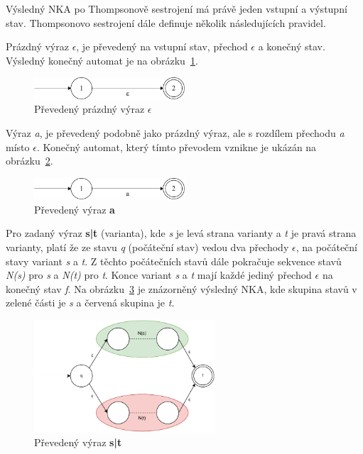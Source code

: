 Výsledný NKA po Thompsonově sestrojení má právě jeden vstupní a výstupní stav. 
Thompsonovo sestrojení dále definuje několik následujících pravidel.

Prázdný výraz \textit{$\epsilon$}, je převedený na vstupní stav, přechod \textit{$\epsilon$} a konečný stav.
Výsledný konečný automat je na obrázku~\ref{fig:NFAepsilon}.
\begin{figure}[!h]
	\centering
	\includegraphics[width=0.5\textwidth]{Figures/NFA_epsilon.pdf}
	\caption{Převedený prázdný výraz \textbf{$\epsilon$}}
	\label{fig:NFAepsilon}
\end{figure}

Výraz \textit{a}, je převedený podobně jako prázdný výraz, ale s rozdílem přechodu \textit{a} místo \textit{$\epsilon$}.
Konečný automat, který tímto převodem vznikne je ukázán na obrázku~\ref{fig:NFAa}.
\begin{figure}[!h]
	\centering
	\includegraphics[width=0.5\textwidth]{Figures/NFA_a.pdf}
	\caption{Převedený výraz \textbf{a}}
	\label{fig:NFAa}
\end{figure}

Pro zadaný výraz \textbf{s|t} (varianta), kde \textit{s} je levá strana varianty a \textit{t} je pravá strana varianty, platí že ze stavu \textit{q} (počáteční stav) vedou dva přechody
\textit{$\epsilon$}, na počáteční stavy variant \textit{s} a \textit{t}. 
Z těchto počátečních stavů dále pokračuje sekvence stavů \textit{N(s)} pro \textit{s} a \textit{N(t)} pro \textit{t}.
Konce variant \textit{s} a \textit{t} mají každé jediný přechod \textit{$\epsilon$} na konečný stav \textit{f}.
Na obrázku~\ref{fig:NFAunion} je znázorněný výsledný NKA, kde skupina stavů v zelené části je \textit{s} a červená skupina je \textit{t}.
\begin{figure}[!h]
	\centering
	\includegraphics[width=0.6\textwidth]{Figures/NFA_union.pdf}
	\caption{Převedený výraz \textbf{s|t}}
	\label{fig:NFAunion}
\end{figure}

